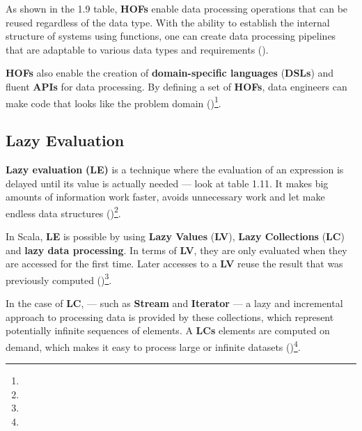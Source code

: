 







As shown in the 1.9 table, \textbf{HOFs} enable data processing operations that can be reused regardless of the data type. With the ability to establish the internal structure of systems using functions, one can create data processing pipelines that are adaptable to various data types and requirements (\cite{michael.etal_2023})\footnotemark[11].

\textbf{HOFs} also enable the creation of \textbf{domain-specific languages} (\textbf{DSLs}) and fluent \textbf{APIs} for data processing. By defining a set of \textbf{HOFs}, data engineers can make code that looks like the problem domain (\cite{michael.etal_2023})\footnote[11]{}.





\subsection{Lazy Evaluation}

\textbf{Lazy evaluation} \textbf{(LE)} is a technique where the evaluation of an expression is delayed until its value is actually needed  — look at table 1.11. It makes big amounts of information work faster, avoids unnecessary work and let make endless data structures (\cite{scalaLazy})\footnote[12]{}.

In Scala, \textbf{LE} is possible by using \textbf{Lazy Values} (\textbf{LV}), \textbf{Lazy Collections} (\textbf{LC}) and \textbf{lazy data processing}. In terms of \textbf{LV}, they  are only evaluated when they are accessed for the first time. Later accesses to a \textbf{LV} reuse the result that was previously computed (\cite{michael.etal_2023})\footnote[11]{}.



In the case of \textbf{LC}, — such as \textbf{Stream} and \textbf{Iterator} — a lazy and incremental approach to processing data is provided by these collections, which represent potentially infinite sequences of elements. A \textbf{LCs} elements are computed on demand, which makes it easy to process large or infinite datasets (\cite{hughesWhyFunctionalProgramming1990})\footnote[13]{}.

